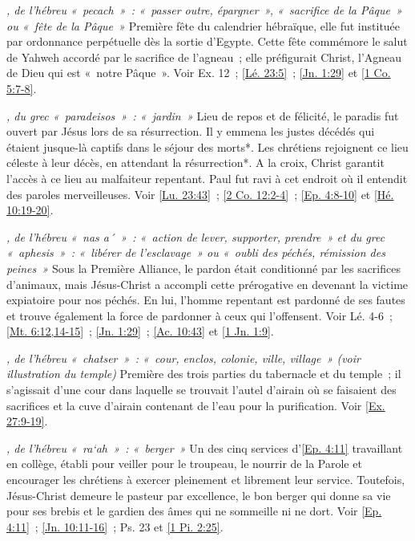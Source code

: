 \begin{multicols}{2}
\textit{, de l'hébreu «~pecach~»~: «~passer outre, épargner~», «~sacrifice de la Pâque~» ou «~fête de la Pâque~»}\newline
Première fête du calendrier hébraïque, elle fut instituée par ordonnance perpétuelle dès la sortie d'Egypte. Cette fête commémore le salut de Yahweh accordé par le sacrifice de l'agneau~; elle préfigurait Christ, l'Agneau de Dieu qui est «~notre Pâque~».\newline
Voir Ex. 12~; \vref{Lé. 23:5}~; \vref{Jn. 1:29} et \vref{1 Co. 5:7-8}.

\textit{, du grec «~paradeisos~»~: «~jardin~»}\newline
Lieu de repos et de félicité, le paradis fut ouvert par Jésus lors de sa résurrection. Il y emmena les justes décédés qui étaient jusque-là captifs dans le séjour des morts*. Les chrétiens rejoignent ce lieu céleste à leur décès, en attendant la résurrection*. A la croix, Christ garantit l'accès à ce lieu au malfaiteur repentant. Paul fut ravi à cet endroit où il entendit des paroles merveilleuses.\newline
Voir \vref{Lu. 23:43}~; \vref{2 Co. 12:2-4}~; \vref{Ep. 4:8-10} et \vref{Hé. 10:19-20}.

\textit{, de l'hébreu «~nas a´~»~: «~action de lever, supporter, prendre~» et du grec «~aphesis~»~: «~libérer de l'esclavage~» ou «~oubli des péchés, rémission des peines~»}\newline
Sous la Première Alliance, le pardon était conditionné par les sacrifices d'animaux, mais Jésus-Christ a accompli cette prérogative en devenant la victime expiatoire pour nos péchés. En lui, l'homme repentant est pardonné de ses fautes et trouve également la force de pardonner à ceux qui l'offensent.\newline
Voir Lé. 4-6~; \vref{Mt. 6:12,14-15}~; \vref{Jn. 1:29}~; \vref{Ac. 10:43} et \vref{1 Jn. 1:9}.

\textit{, de l'hébreu «~chatser~»~: «~cour, enclos, colonie, ville, village~» (voir illustration du temple)}\newline
Première des trois parties du tabernacle et du temple~; il s'agissait d'une cour dans laquelle se trouvait l'autel d'airain où se faisaient des sacrifices et la cuve d'airain contenant de l'eau pour la purification. Voir \vref{Ex. 27:9-19}.

\textit{, de l'hébreu «~ra`ah~»~: «~berger~»}\newline
Un des cinq services d'\vref{Ep. 4:11} travaillant en collège, établi pour veiller pour le troupeau, le nourrir de la Parole et encourager les chrétiens à exercer pleinement et librement leur service. Toutefois, Jésus-Christ demeure le pasteur par excellence, le bon berger qui donne sa vie pour ses brebis et le gardien des âmes qui ne sommeille ni ne dort.\newline
Voir \vref{Ep. 4:11}~; \vref{Jn. 10:11-16}~; Ps. 23 et \vref{1 Pi. 2:25}.


\end{multicols}
